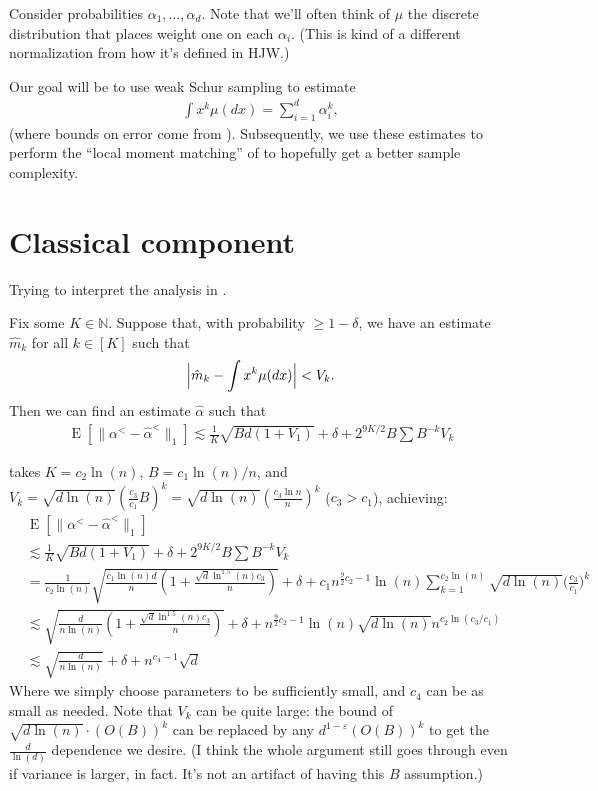 \documentclass{article}
\theoremstyle{definition}
\DeclareMathOperator{\E}{E}
\DeclarePairedDelimiter{\abs}{\lvert}{\rvert}
\newcommand{\eps}{\varepsilon}
\begin{document}
Consider probabilities $\alpha_1,\ldots,\alpha_d$.
Note that we'll often think of $\mu$ the discrete distribution that places weight one on each $\alpha_i$.
(This is kind of a different normalization from how it's defined in HJW.)

Our goal will be to use weak Schur sampling to estimate
\begin{align*}
    \int x^k \mu(dx) = \sum_{i=1}^d \alpha_i^k,
\end{align*}
(where bounds on error come from \cite{aisw19}).
Subsequently, we use these estimates to perform the ``local moment matching'' of \cite{hjw18} to hopefully get a better sample complexity.

\section{Classical component}

Trying to interpret the analysis in \cite{hjw18}.

\begin{theorem}
Fix some $K \in \mathbb{N}$.
Suppose that, with probability $\geq 1-\delta$, we have an estimate $\hat{m}_k$ for all $k \in [K]$ such that
\begin{align*}
    \abs[\Big]{\hat{m}_k - \int x^k \mu(dx)} < V_k.
\end{align*}
Then we can find an estimate $\hat{\alpha}$ such that
\begin{align*}
    \E[\|\alpha^< - \hat{\alpha}^<\|_1] \lesssim \frac1K\sqrt{Bd(1+V_1)} + \delta + 2^{9K/2}B\sum B^{-k}V_k
\end{align*}
\end{theorem}

\cite{hjw18} takes $K = c_2 \ln (n)$, $B = c_1\ln(n)/n$, and $V_k = \sqrt{d\ln(n)}(\frac{c_3}{c_1}B)^k = \sqrt{d\ln(n)}(\frac{c_3\ln n}{n})^k$ ($c_3 > c_1$), achieving:
\begin{align*}
    &\E[\|\alpha^< - \hat{\alpha}^<\|_1] \\
    &\lesssim \frac1K\sqrt{Bd(1+V_1)} + \delta + 2^{9K/2}B\sum B^{-k}V_k \\
    &= \frac{1}{c_2\ln(n)}\sqrt{\frac{c_1\ln(n)d}{n}(1+\frac{\sqrt{d}\ln^{1.5}(n)c_3}{n})} + \delta + c_1n^{\frac{9}{2}c_2 - 1}\ln(n)\sum_{k=1}^{c_2\ln(n)} \sqrt{d\ln(n)}\Big(\frac{c_3}{c_1}\Big)^k \\
    &\lesssim \sqrt{\frac{d}{n\ln(n)}(1+\frac{\sqrt{d}\ln^{1.5}(n)c_3}{n})} + \delta + n^{\frac{9}{2}c_2 - 1}\ln(n)\sqrt{d\ln(n)}n^{c_2\ln(c_3/c_1)} \\
    &\lesssim \sqrt{\frac{d}{n\ln(n)}} + \delta + n^{c_4-1}\sqrt{d}
\end{align*}
Where we simply choose parameters to be sufficiently small, and $c_4$ can be as small as needed.
Note that $V_k$ can be quite large: the bound of $\sqrt{d\ln(n)}\cdot (O(B))^k$ can be replaced by any $d^{1-\eps}(O(B))^k$ to get the $\frac{d}{\ln(d)}$ dependence we desire.
(I think the whole argument still goes through even if variance is larger, in fact. It's not an artifact of having this $B$ assumption.)
\end{document}
